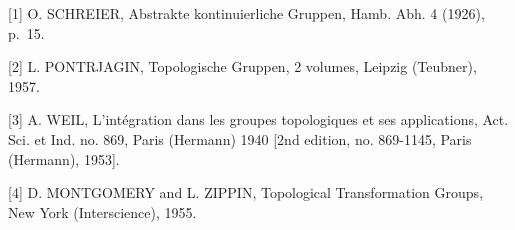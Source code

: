 
{[}1{]} O. SCHREIER, Abstrakte kontinuierliche Gruppen, Hamb. Abh. 4 (1926), p.~15.

{[}2{]} L. PONTRJAGIN, Topologische Gruppen, 2 volumes, Leipzig (Teubner), 1957.

{[}3{]} A. WEIL, L'intégration dans les groupes topologiques et ses applications, Act. Sci. et Ind. no. 869, Paris (Hermann) 1940 {[}2nd edition, no. 869-1145, Paris (Hermann), 1953{]}.

{[}4{]} D. MONTGOMERY and L. ZIPPIN, Topological Transformation Groups, New York (Interscience), 1955.

